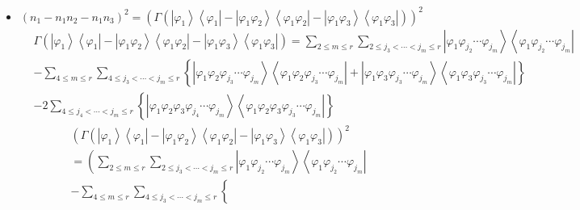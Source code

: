 \documentclass[aps,preprint]{revtex4}%
\begin{document}
\begin{itemize}
\item
\begin{equation}
\left(  n_{1}-n_{1}n_{2}-n_{1}n_{3}\right)  ^{2}=\left(  \Gamma\left(
\left\vert \varphi_{1}\right\rangle \left\langle \varphi_{1}\right\vert
-\left\vert \varphi_{1}\varphi_{2}\right\rangle \left\langle \varphi
_{1}\varphi_{2}\right\vert -\left\vert \varphi_{1}\varphi_{3}\right\rangle
\left\langle \varphi_{1}\varphi_{3}\right\vert \right)  \right)  ^{2}%
\end{equation}%
\begin{align}
&  \Gamma\left(  \left\vert \varphi_{1}\right\rangle \left\langle \varphi
_{1}\right\vert -\left\vert \varphi_{1}\varphi_{2}\right\rangle \left\langle
\varphi_{1}\varphi_{2}\right\vert -\left\vert \varphi_{1}\varphi
_{3}\right\rangle \left\langle \varphi_{1}\varphi_{3}\right\vert \right)
=\sum_{2\leq m\leq r}\sum_{2\leq j_{3}<\cdots<j_{m}\leq r}\left\vert
\varphi_{1}\varphi_{j_{2}}\cdots\varphi_{j_{m}}\right\rangle \left\langle
\varphi_{1}\varphi_{j_{2}}\cdots\varphi_{j_{m}}\right\vert \\
&  -\sum_{4\leq m\leq r}\sum_{4\leq j_{3}<\cdots<j_{m}\leq r}\left\{
\left\vert \varphi_{1}\varphi_{2}\varphi_{j_{3}}\cdots\varphi_{j_{m}%
}\right\rangle \left\langle \varphi_{1}\varphi_{2}\varphi_{j_{3}}\cdots
\varphi_{j_{m}}\right\vert +\left\vert \varphi_{1}\varphi_{3}\varphi_{j_{3}%
}\cdots\varphi_{j_{m}}\right\rangle \left\langle \varphi_{1}\varphi_{3}%
\varphi_{j_{3}}\cdots\varphi_{j_{m}}\right\vert \right\} \\
&  -2\sum_{4\leq j_{4}<\cdots<j_{m}\leq r}\left\{  \left\vert \varphi
_{1}\varphi_{2}\varphi_{3}\varphi_{j_{4}}\cdots\varphi_{j_{m}}\right\rangle
\left\langle \varphi_{1}\varphi_{2}\varphi_{3}\varphi_{j_{3}}\cdots
\varphi_{j_{m}}\right\vert \right\}
\end{align}%
\begin{align}
&  \left(  \Gamma\left(  \left\vert \varphi_{1}\right\rangle \left\langle
\varphi_{1}\right\vert -\left\vert \varphi_{1}\varphi_{2}\right\rangle
\left\langle \varphi_{1}\varphi_{2}\right\vert -\left\vert \varphi_{1}%
\varphi_{3}\right\rangle \left\langle \varphi_{1}\varphi_{3}\right\vert
\right)  \right)  ^{2}\\
&  =\left(  \sum_{2\leq m\leq r}\sum_{2\leq j_{3}<\cdots<j_{m}\leq
r}\left\vert \varphi_{1}\varphi_{j_{2}}\cdots\varphi_{j_{m}}\right\rangle
\left\langle \varphi_{1}\varphi_{j_{2}}\cdots\varphi_{j_{m}}\right\vert
\right. \\
&  -\sum_{4\leq m\leq r}\sum_{4\leq j_{3}<\cdots<j_{m}\leq r}\left\{

\end{align}
\end{itemize}
\end{document}
